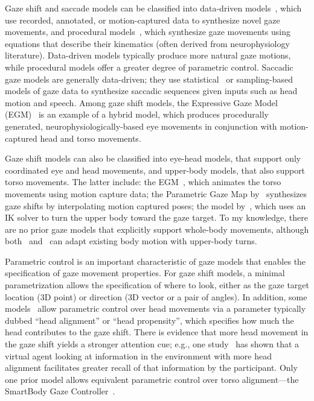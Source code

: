 Gaze shift and saccade models can be classified into data-driven models~\citep{heck2007automated,lance2010expressive,lee2002eyes,deng2005automated,ma2009natural,le2012live}, which use recorded, annotated, or motion-captured data to synthesize novel gaze movements, and procedural models~\citep{peters2010animating,thiebaux2009realtime}, which synthesize gaze movements using equations that describe their kinematics (often derived from neurophysiology literature). Data-driven models typically produce more natural gaze motions, while procedural models offer a greater degree of parametric control. Saccadic gaze models are generally data-driven; they use statistical~\citep{lee2002eyes,ma2009natural,le2012live} or sampling-based~\citep{deng2005automated} models of gaze data to synthesize saccadic sequences given inputs such as head motion and speech. Among gaze shift models, the Expressive Gaze Model (EGM)~\citep{lance2010expressive} is an example of a hybrid model, which produces procedurally generated, neurophysiologically-based eye movements in conjunction with motion-captured head and torso movements.

Gaze shift models can also be classified into eye-head models, that support only coordinated eye and head movements, and upper-body models, that also support torso movements. The latter include: the EGM~\citep{lance2010expressive}, which animates the torso movements using motion capture data; the Parametric Gaze Map by~\citet{heck2007automated} synthesizes gaze shifts by interpolating motion captured poses; the model by~\citet{grillon2009crowds}, which uses an IK solver to turn the upper body toward the gaze target. To my knowledge, there are no prior gaze models that explicitly support whole-body movements, although both~\citep{heck2007automated} and~\citep{grillon2009crowds} can adapt existing body motion with upper-body turns.

Parametric control is an important characteristic of gaze models that enables the specification of gaze movement properties. For gaze shift models, a minimal parametrization allows the specification of where to look, either as the gaze target location (3D point) or direction (3D vector or a pair of angles). In addition, some models~\citep{peters2010animating,lance2010expressive,thiebaux2009realtime} allow parametric control over head movements via a parameter typically dubbed ``head alignment'' or ``head propensity'', which specifies how much the head contributes to the gaze shift. There is evidence that more head movement in the gaze shift yields a stronger attention cue; e.g., one study~\citep{andrist2012designing} has shown that a virtual agent looking at information in the environment with more head alignment facilitates greater recall of that information by the participant. Only one prior model allows equivalent parametric control over torso alignment---the SmartBody Gaze Controller~\citep{thiebaux2009realtime}.

